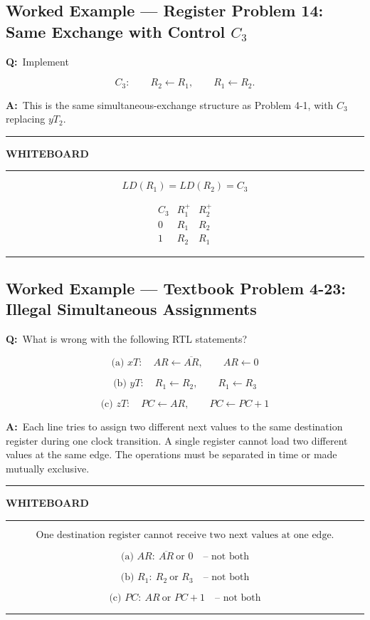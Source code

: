 \documentclass[11pt]{article}
\newenvironment{whiteboard}
{
    \par\medskip
    \hrule
    \vspace{0.35em}
    \noindent\textbf{\large WHITEBOARD}
    \par\vspace{0.3em}
    \hrule
    \vspace{0.65em}
}
{
    \vspace{0.45em}
    \hrule
    \par\medskip
}
\newcommand{\Q}{\par\noindent\textbf{Q:}\ }
\newcommand{\A}{\par\noindent\textbf{A:}\ }
\newcommand{\worked}[1]{%
    \subsection*{Worked Example --- #1}
}
\begin{document}
\worked{Register Problem 14: Same Exchange with Control $C_3$}

\Q Implement

\[
C_3:\qquad R_2\leftarrow R_1,\qquad R_1\leftarrow R_2.
\]

\A This is the same simultaneous-exchange structure as Problem 4-1, with $C_3$ replacing $yT_2$.

\begin{whiteboard}

\[
\boxed{LD(R_1)=LD(R_2)=C_3}
\]

\[
\begin{array}{c|cc}
C_3&R_1^+&R_2^+\\
\hline
0&R_1&R_2\\
1&R_2&R_1
\end{array}
\]

\end{whiteboard}

\worked{Textbook Problem 4-23: Illegal Simultaneous Assignments}

\Q What is wrong with the following RTL statements?

\[
\text{(a) }xT:\quad AR\leftarrow\overline{AR},\qquad AR\leftarrow0
\]

\[
\text{(b) }yT:\quad R_1\leftarrow R_2,\qquad R_1\leftarrow R_3
\]

\[
\text{(c) }zT:\quad PC\leftarrow AR,\qquad PC\leftarrow PC+1
\]

\A Each line tries to assign two different next values to the same destination register during one clock transition. A single register cannot load two different values at the same edge. The operations must be separated in time or made mutually exclusive.

\begin{whiteboard}

\[
\boxed{\text{One destination register cannot receive two next values at one edge.}}
\]

\[
\text{(a) }AR:\ \overline{AR}\ \text{or }0\quad\text{-- not both}
\]

\[
\text{(b) }R_1:\ R_2\ \text{or }R_3\quad\text{-- not both}
\]

\[
\text{(c) }PC:\ AR\ \text{or }PC+1\quad\text{-- not both}
\]

\end{whiteboard}
\end{document}

